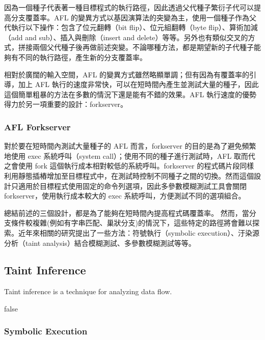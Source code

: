 因為一個種子代表著一種目標程式的執行路徑，因此透過父代種子繁衍子代可以提高分支覆蓋率。AFL 的變異方式以基因演算法的突變為主，使用一個種子作為父代執行以下操作：包含了位元翻轉（bit flip）、位元組翻轉（byte flip）、算術加減（add and sub）、插入與刪除（insert and delete）等等。另外也有類似交叉的方式，拼接兩個父代種子後再做前述突變。不論哪種方法，都是期望新的子代種子能夠有不同的執行路徑，產生新的分支覆蓋率。

相對於廣闊的輸入空間，AFL 的變異方式雖然略顯單調；但有因為有覆蓋率的引導，加上 AFL 執行的速度非常快，可以在短時間內產生並測試大量的種子，因此這個簡單粗暴的方法在多數的情況下還是能有不錯的效果。AFL 執行速度的優勢得力於另一項重要的設計：forkserver。

\subsubsection{AFL Forkserver}

對於要在短時間內測試大量種子的 AFL 而言，forkserver 的目的是為了避免頻繁地使用 exec 系統呼叫（system call）；使用不同的種子進行測試時，AFL 取而代之會使用 fork 這個執行成本相對較低的系統呼叫。forkserver 的程式碼片段同樣利用靜態插樁增加至目標程式中，在測試時控制不同種子之間的切換。然而這個設計只適用於目標程式使用固定的命令列選項，因此多參數模糊測試工具會關閉 forkserver，使用執行成本較大的 exec 系統呼叫，方便測試不同的選項組合。

總結前述的三個設計，都是為了能夠在短時間內提高程式碼覆蓋率。
然而，當分支條件較複雜(例如有字串匹配、巢狀分支)的情況下，這些特定的路徑將會難以探索。近年來相關的研究提出了一些方法：符號執行（symbolic execution）、汙染源分析（taint analysis）結合模糊測試、多參數模糊測試等等。
\fi

\subsection{Taint Inference} %

Taint inference is a technique for analyzing data flow.


\if false
\subsubsection{Symbolic Execution} %

